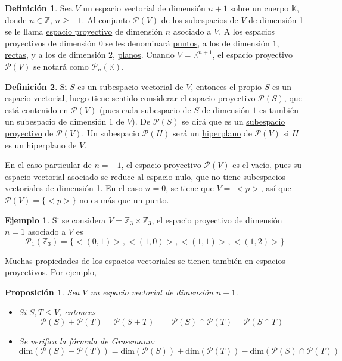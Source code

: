 \documentclass[12pt]{report}
\newtheorem{proposition}{Proposición}[chapter]
\theoremstyle{definition}
\newtheorem{definition}{Definición}[chapter]
\theoremstyle{definition}
\newtheorem{example}{Ejemplo}[chapter]
\theoremstyle{remark}
\newcommand{\Z}{\mathbb Z}
\begin{document}
\begin{definition}
Sea $V$ un espacio vectorial de dimensión $n+1$ sobre un cuerpo $\mathbb{K}$, donde $n \in \Z$, $n \geq -1$. Al conjunto $\mathcal{P}(V)$ de los subespacios de $V$ de dimensión 1 se le llama \ul{espacio proyectivo} de dimensión $n$ asociado a $V$. A los espacios proyectivos de dimensión $0$ se les denominará \ul{puntos}, a los de dimensión $1$, \ul{rectas}, y a los de dimensión $2$, \ul{planos}. Cuando $V = \mathbb{K}^{n+1}$, el espacio proyectivo $\mathcal{P}(V)$ se notará como $\mathcal{P}_n(\mathbb{K})$.
\end{definition}

\begin{definition}
Si $S$ es un subespacio vectorial de $V$, entonces el propio $S$ es un espacio vectorial, luego tiene sentido considerar el espacio proyectivo $\mathcal{P}(S)$, que está contenido en $\mathcal{P}(V)$ (pues cada subespacio de $S$ de dimensión $1$ es también un subespacio de dimensión $1$ de $V$). De $\mathcal{P}(S)$ se dirá que es un \ul{subespacio proyectivo} de $\mathcal{P}(V)$. Un subespacio $\mathcal{P}(H)$ será un \ul{hiperplano} de $\mathcal{P}(V)$ si $H$ es un hiperplano de $V$.
\end{definition}

En el caso particular de $n = -1$, el espacio proyectivo $\mathcal{P}(V)$ es el vacío, pues su espacio vectorial asociado se reduce al espacio nulo, que no tiene subespacios vectoriales de dimensión 1. En el caso $n = 0$, se tiene que $V = \ <p>$, así que $\mathcal{P}(V) = \{<p>\}$ no es más que un punto.

\begin{example}
Si se considera $\displaystyle V = \Z_3 \times \Z_3$, el espacio proyectivo de dimensión $n = 1$ asociado a $V$ es
\[\mathcal{P}_1(\Z_3) = \{<(0,1)>,<(1,0)>,<(1,1)>,<(1,2)>\}\]
\end{example}

Muchas propiedades de los espacios vectoriales se tienen también en espacios proyectivos. Por ejemplo, 

\begin{proposition}
Sea $V$ un espacio vectorial de dimensión $n+1$.
\begin{itemize}
    \item[(i)] Si $S, T \leq V$, entonces 
    \[\mathcal{P}(S)+\mathcal{P}(T)=\mathcal{P}(S+T) \qquad \mathcal{P}(S) \cap \mathcal{P}(T)=\mathcal{P}(S \cap T)\]
    \item[(ii)] Se verifica la fórmula de Grassmann:
    \[\mathrm{dim}(\mathcal{P}(S)+\mathcal{P}(T)) = \mathrm{dim}(\mathcal{P}(S))+\mathrm{dim}(\mathcal{P}(T))-\mathrm{dim}(\mathcal{P}(S) \cap \mathcal{P}(T))\]
\end{itemize}
\end{proposition}
\end{document}
